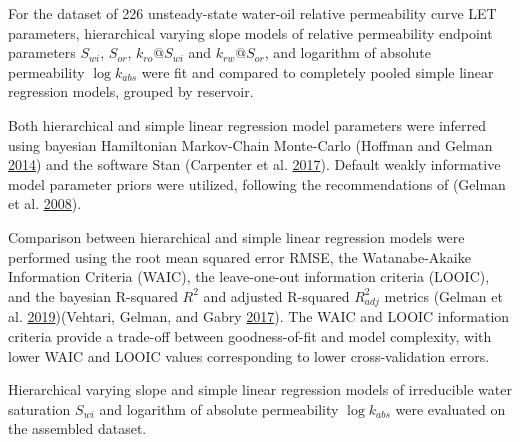 \documentclass[english,msc,numbers]{coppe}
\begin{document}
  For the dataset of 226 unsteady-state water-oil relative permeability curve LET parameters, hierarchical varying slope models of relative permeability endpoint parameters \(S_{wi}\), \(S_{or}\), \(k_{ro}@S_{wi}\) and \(k_{rw}@S_{or}\), and logarithm of absolute permeability \(\log{k_{abs}}\) were fit and compared to completely pooled simple linear regression models, grouped by reservoir.
  
  Both hierarchical and simple linear regression model parameters were inferred using bayesian Hamiltonian Markov-Chain Monte-Carlo (Hoffman and Gelman \protect\hyperlink{ref-Hoffman2014}{2014}) and the software Stan (Carpenter et al. \protect\hyperlink{ref-Carpenter2017}{2017}). Default weakly informative model parameter priors were utilized, following the recommendations of (Gelman et al. \protect\hyperlink{ref-Gelman2008}{2008}).
  
  Comparison between hierarchical and simple linear regression models were performed using the root mean squared error RMSE, the Watanabe-Akaike Information Criteria (WAIC), the leave-one-out information criteria (LOOIC), and the bayesian R-squared \(R^2\) and adjusted R-squared \(R_{adj}^2\) metrics (Gelman et al. \protect\hyperlink{ref-GelmanGoodrich2019}{2019})(Vehtari, Gelman, and Gabry \protect\hyperlink{ref-Vehtari2017}{2017}). The WAIC and LOOIC information criteria provide a trade-off between goodness-of-fit and model complexity, with lower WAIC and LOOIC values corresponding to lower cross-validation errors.
  
  Hierarchical varying slope and simple linear regression models of irreducible water saturation \(S_{wi}\) and logarithm of absolute permeability \(\log{k_{abs}}\) were evaluated on the assembled dataset.
  
\end{document}
